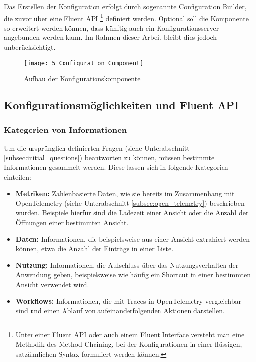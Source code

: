 Das Erstellen der Konfiguration erfolgt durch sogenannte Configuration Builder, die zuvor über eine Fluent API \footnote{Unter einer Fluent API oder auch einem Fluent Interface \cite{Fowler2005FluentInterface} versteht man eine Methodik des Method-Chaining, bei der Konfigurationen in einer flüssigen, satzähnlichen Syntax formuliert werden können.} definiert werden. Optional soll die Komponente so erweitert werden können, dass künftig auch ein Konfigurationsserver angebunden werden kann. Im Rahmen dieser Arbeit bleibt dies jedoch unberücksichtigt.

\begin{figure}[H]
    \centering
    \texttt{[image: 5\_Configuration\_Component]}
    \caption{Aufbau der Konfigurationskomponente}
    \label{fig:configuration_component}
\end{figure}

\subsection{Konfigurationsmöglichkeiten und Fluent API}

\subsubsection{Kategorien von Informationen}
Um die ursprünglich definierten Fragen (siehe Unterabschnitt \ref{subsec:initial_questions}) beantworten zu können, müssen bestimmte Informationen gesammelt werden. Diese lassen sich in folgende Kategorien einteilen:

\begin{itemize}
    \item \textbf{Metriken:} Zahlenbasierte Daten, wie sie bereits im Zusammenhang mit OpenTelemetry (siehe Unterabschnitt \ref{subsec:open_telemetry}) beschrieben wurden. Beispiele hierfür sind die Ladezeit einer Ansicht oder die Anzahl der Öffnungen einer bestimmten Ansicht.
    \item \textbf{Daten:} Informationen, die beispielsweise aus einer Ansicht extrahiert werden können, etwa die Anzahl der Einträge in einer Liste.
    \item \textbf{Nutzung:} Informationen, die Aufschluss über das Nutzungsverhalten der Anwendung geben, beispielsweise wie häufig ein Shortcut in einer bestimmten Ansicht verwendet wird.
    \item \textbf{Workflows:} Informationen, die mit Traces in OpenTelemetry vergleichbar sind und einen Ablauf von aufeinanderfolgenden Aktionen darstellen.
\end{itemize}

